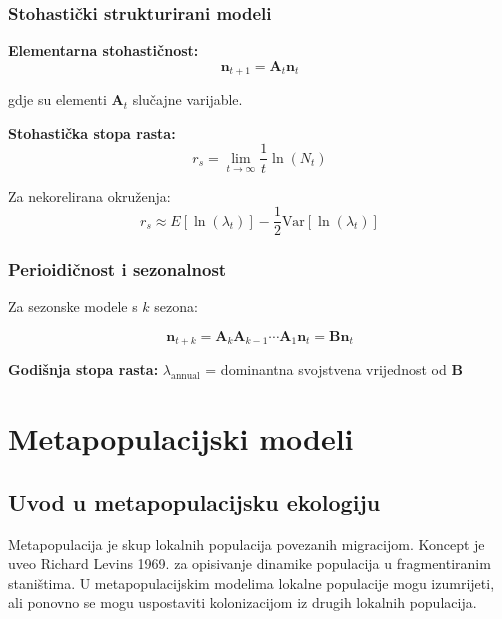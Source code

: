 \documentclass[11pt,oneside]{book}
\begin{document}
\subsubsection{Stohastički strukturirani modeli}

\textbf{Elementarna stohastičnost:}
\begin{equation}
	\mathbf{n}_{t+1} = \mathbf{A}_t \mathbf{n}_t
\end{equation}

gdje su elementi $\mathbf{A}_t$ slučajne varijable.

\textbf{Stohastička stopa rasta:}
\begin{equation}
	r_s = \lim_{t \to \infty} \frac{1}{t} \ln(N_t)
\end{equation}

Za nekorelirana okruženja:
\begin{equation}
	r_s \approx E[\ln(\lambda_t)] - \frac{1}{2} \text{Var}[\ln(\lambda_t)]
\end{equation}

\subsubsection{Perioidičnost i sezonalnost}

Za sezonske modele s $k$ sezona:

\begin{equation}
	\mathbf{n}_{t+k} = \mathbf{A}_k \mathbf{A}_{k-1} \cdots \mathbf{A}_1 \mathbf{n}_t = \mathbf{B} \mathbf{n}_t
\end{equation}

\textbf{Godišnja stopa rasta:}
$\lambda_{\text{annual}}$ = dominantna svojstvena vrijednost od $\mathbf{B}$

\section{Metapopulacijski modeli}

\subsection{Uvod u metapopulacijsku ekologiju}

Metapopulacija je skup lokalnih populacija povezanih migracijom. Koncept je uveo Richard Levins 1969. za opisivanje dinamike populacija u fragmentiranim staništima. U metapopulacijskim modelima lokalne populacije mogu izumrijeti, ali ponovno se mogu uspostaviti kolonizacijom iz drugih lokalnih populacija.
\end{document}
